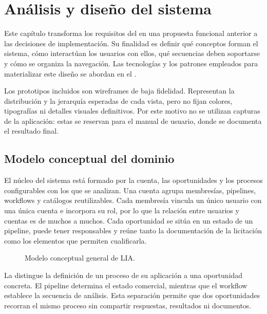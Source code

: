 \chapter{Análisis y diseño del sistema}
\label{chap:analysis}

Este capítulo transforma los requisitos del  en una
propuesta funcional anterior a las decisiones de implementación. Su finalidad
es definir qué conceptos forman el sistema, cómo interactúan los usuarios con
ellos, qué secuencias deben soportarse y cómo se organiza la navegación. Las
tecnologías y los patrones empleados para materializar este diseño se abordan
en el .

Los prototipos incluidos son wireframes de baja fidelidad. Representan la
distribución y la jerarquía esperadas de cada vista, pero no fijan colores,
tipografías ni detalles visuales definitivos. Por este motivo no se utilizan
capturas de la aplicación: estas se reservan para el manual de usuario, donde
se documenta el resultado final.

\section{Modelo conceptual del dominio}

El núcleo del sistema está formado por la cuenta, las oportunidades y los
procesos configurables con los que se analizan. Una cuenta agrupa membresías,
pipelines, workflows y catálogos reutilizables. Cada membresía vincula un único
usuario con una única cuenta e incorpora su rol, por lo que la relación entre
usuarios y cuentas es de muchos a muchos. Cada oportunidad se sitúa en un
estado de un pipeline, puede tener responsables y reúne tanto la documentación
de la licitación como los elementos que permiten cualificarla.

\begin{figure}[H]
  \centering
  \resizebox{\textwidth}{!}{
    
  }
  \caption{Modelo conceptual general de LIA.}
  \label{fig:domain-model-overview}
\end{figure}

La  distingue la definición de un proceso de su
aplicación a una oportunidad concreta. El pipeline determina el estado
comercial, mientras que el workflow establece la secuencia de análisis. Esta
separación permite que dos oportunidades recorran el mismo proceso sin
compartir respuestas, resultados ni documentos.

